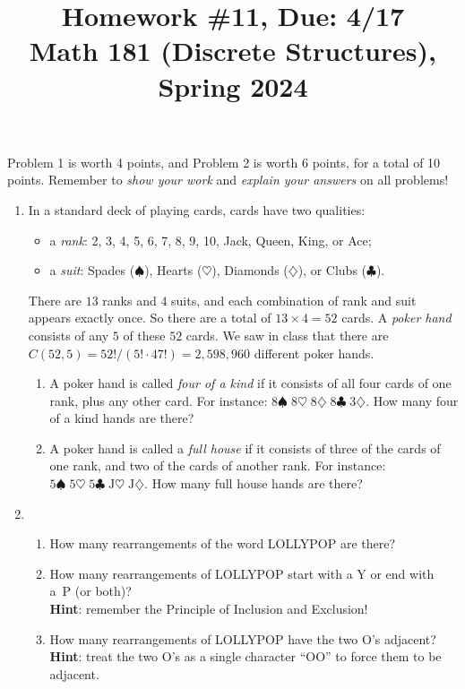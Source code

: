 \documentclass[11pt]{article}
\title{Homework \#11, Due: 4/17 \\Math 181 (Discrete Structures), Spring 2024}
\date{}
\begin{document}
\maketitle

\thispagestyle{empty}

\vspace{-1cm}

Problem 1 is worth 4 points, and Problem 2 is worth 6 points, for a total of 10 points. Remember to \emph{show your work} and \emph{explain your answers} on all problems!

\begin{enumerate}

\item In a standard deck of playing cards, cards have two qualities:
\begin{itemize}
\item a \emph{rank}: 2, 3, 4, 5, 6, 7, 8, 9, 10, Jack, Queen, King, or Ace;
\item a \emph{suit}: Spades ($\spadesuit$), Hearts ($\heartsuit$), Diamonds ($\diamondsuit$), or Clubs ($\clubsuit$).
\end{itemize}
There are $13$ ranks and $4$ suits, and each combination of rank and suit appears exactly once. So there are a total of $13 \times 4 = 52$ cards. A \emph{poker hand} consists of any $5$ of these $52$ cards. We saw in class that there are $C(52,5) = 52!/(5! \cdot 47!)=2,598,960$ different poker hands.
\begin{enumerate}
\item A poker hand is called \emph{four of a kind} if it consists of all four cards of one rank, plus any other card. For instance: $8\spadesuit \; 8\heartsuit \; 8\diamondsuit \; 8\clubsuit \; 3\diamondsuit$. How many four of a kind hands are there?
\item A poker hand is called a \emph{full house} if it consists of three of the cards of one rank, and two of the cards of another rank. For instance: $5\spadesuit \; 5\heartsuit \; 5\clubsuit \; \mathrm{J}\heartsuit \; \mathrm{J}\diamondsuit$. How many full house hands are there?
\end{enumerate}

\item \begin{enumerate}
\item How many rearrangements of the word LOLLYPOP are there?
\item How many rearrangements of LOLLYPOP start with a Y or end with a~P (or both)? \\ {\bf Hint}: remember the Principle of Inclusion and Exclusion!
\item How many rearrangements of LOLLYPOP have the two O's adjacent? \\ {\bf Hint}: treat the two O's as a single character ``OO'' to force them to be adjacent.
\end{enumerate}

\end{enumerate}
\end{document}
